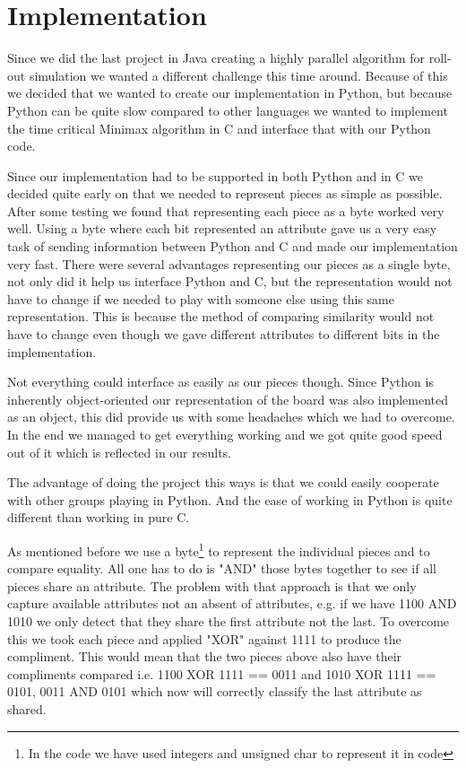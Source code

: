 \section{Implementation}\label{implementation}
Since we did the last project in Java creating a highly parallel algorithm for
roll-out simulation we wanted a different challenge this time around. Because
of this we decided that we wanted to create our implementation in Python, but
because Python can be quite slow compared to other languages we wanted to implement the
time critical Minimax algorithm in C and interface that with our Python code.

Since our implementation had to be supported in both Python and in C we decided
quite early on that we needed to represent pieces as simple as possible. After
some testing we found that representing each piece as a byte worked very well.
Using a byte where each bit represented an attribute gave us a very easy task
of sending information between Python and C and made our implementation very
fast. There were several advantages representing our pieces as a single byte,
not only did it help us interface Python and C, but the representation would
not have to change if we needed to play with someone else using this same
representation. This is because the method of comparing similarity would not
have to change even though we gave different attributes to different bits in
the implementation.

Not everything could interface as easily as our pieces though. Since Python is 
inherently object-oriented our representation of the \quarto{} board was also 
implemented as an object, this did provide us with some headaches which we 
had to overcome.
In the end we managed to get everything working and we got quite good speed 
out of it which is reflected in our results.

The advantage of doing the project this ways is that we could easily cooperate
with other groups playing in Python. And the ease of working in Python is
quite different than working in pure C.

As mentioned before we use a byte\footnote{In the code we have used integers and
unsigned char to represent it in code} to represent the individual pieces and to
compare equality. All one has to do is "AND" those bytes together to see if all
pieces share an attribute. The problem with that approach is that we only capture
available attributes not an absent of attributes, e.g. if we have 1100 AND 1010
we only detect that they share the first attribute not the last. To overcome this
we took each piece and applied "XOR" against 1111 to produce the compliment.
This would mean that the two pieces above also have their compliments compared
i.e. 1100 XOR 1111 == 0011 and 1010 XOR 1111 == 0101, 0011 AND 0101 which now will correctly
classify the last attribute as shared.
